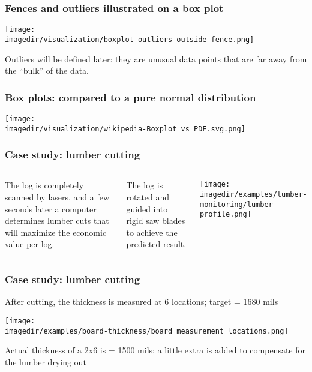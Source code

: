 \begin{frame}\frametitle{Fences and outliers illustrated on a box plot}
	
	\centerline{\texttt{[image: \\imagedir/visualization/boxplot-outliers-outside-fence.png]}}
	
	\vspace{24pt}
	Outliers will be defined later: they are unusual data points that are far away from the ``bulk'' of the data.
\end{frame}

\begin{frame}\frametitle{Box plots: compared to a pure normal distribution}
	\begin{center}
		\texttt{[image: \\imagedir/visualization/wikipedia-Boxplot\_vs\_PDF.svg.png]}
	\end{center}
	\vspace{-16pt}
\end{frame}

\begin{frame}\frametitle{Case study: lumber cutting}
	\begin{columns}[c]
			
			The log is completely scanned by lasers, and a few seconds later a computer determines lumber cuts that will maximize the  economic value per log.
			
			\vspace{12pt}
			The log is rotated and guided into rigid saw blades to achieve the predicted result.
			
			\vspace{-24pt}
			\begin{center}
				\texttt{[image: \\imagedir/examples/lumber-monitoring/lumber-profile.png]}
			\end{center}
	\end{columns}
\end{frame}

\begin{frame}\frametitle{Case study: lumber cutting}
	
	After cutting, the thickness is measured at 6 locations; target = 1680 mils
	\begin{center}
		\texttt{[image: \\imagedir/examples/board-thickness/board\_measurement\_locations.png]}
	\end{center}
	\vfill
	Actual thickness of a 2x6 is = 1500 mils; a little extra is added to compensate for the lumber drying out
\end{frame}

